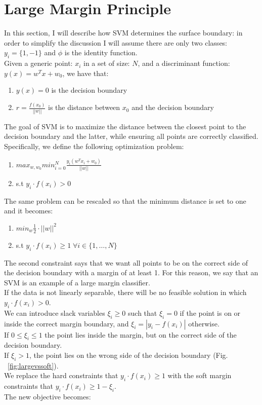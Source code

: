 \documentclass[LaM,binding=0.6cm]{sapthesis}
\begin{document}
\section{Large Margin Principle}
In this section, I will describe how SVM determines the surface boundary: in order to simplify the discussion I will assume there are only two classes: $y_i=\{1,-1\}$ and $\phi$ is the identity function.\\Given a generic point: $x_i$ in a set of size: $N$, and a discriminant function: $y(x)=w^Tx+w_0$, we have that:
\begin{enumerate}
\item $y(x)=0$ is the decision boundary
\item $r=\frac{f(x_0)}{||w||}$ is the distance between $x_0$ and the decision boundary
\end{enumerate}
The goal of SVM is to maximize the distance between the closest point to the decision boundary and the latter, while ensuring all points are correctly classified.\\Specifically, we define the following optimization problem:
\begin{enumerate}
\item $max_{w,w_0}min_{i=0}^N\frac{y_i(w^Tx_i+w_0)}{||w||}$ 
\item s.t $y_i\cdot f(x_i)>0$
\end{enumerate}
The same problem can be rescaled so that the minimum distance is set to one and it becomes:
\begin{enumerate}
\item $min_{w} \frac{1}{2}\cdot||w||^2$ 
\item s.t $y_i\cdot f(x_i)\geq1 \; \forall i \in \{1,\dots,N\}$
\end{enumerate}
The second constraint says that we want all points to be on the correct side of the decision boundary with a margin of at least 1. For this reason, we say that an SVM is an example of a large margin classifier.\\If the data is not linearly separable, there will be no feasible solution in which $y_i\cdot f(x_i)>0$.\\We can introduce slack variables $\xi_i\geq 0$ such that $\xi_i = 0$ if the point is on or inside the correct margin boundary, and $\xi_i = |y_i - f(x_i)|$ otherwise.\\If $0 \leq \xi_i\leq 1$ the point lies inside the margin, but on the correct side of the decision boundary.\\If $\xi_i > 1$, the point lies on the wrong side of the decision boundary (Fig. ~\ref{fig:largevssoft}).\\We replace the hard constraints that $y_i\cdot f(x_i) \geq 1$ with the soft margin constraints that $y_i\cdot f(x_i)\geq 1 - \xi_i$.\\The new objective becomes:
\end{document}
